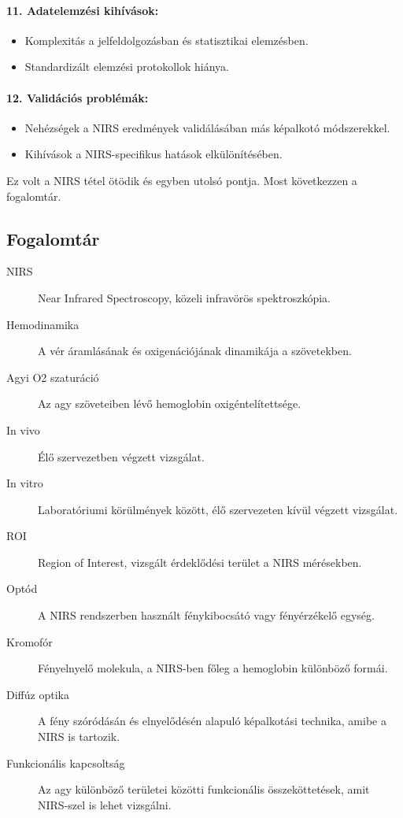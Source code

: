 \documentclass[a4paper,12pt]{article}
\begin{document}
\paragraph{11. Adatelemzési kihívások:} \begin{itemize} \item Komplexitás a jelfeldolgozásban és statisztikai elemzésben. \item Standardizált elemzési protokollok hiánya. \end{itemize}

\paragraph{12. Validációs problémák:} \begin{itemize} \item Nehézségek a NIRS eredmények validálásában más képalkotó módszerekkel. \item Kihívások a NIRS-specifikus hatások elkülönítésében. \end{itemize}

Ez volt a NIRS tétel ötödik és egyben utolsó pontja. Most következzen a fogalomtár.

\subsection{Fogalomtár} 

\begin{description} \item[NIRS] Near Infrared Spectroscopy, közeli infravörös spektroszkópia.

\item[Hemodinamika] A vér áramlásának és oxigenációjának dinamikája a szövetekben. \item[Agyi O2 szaturáció] Az agy szöveteiben lévő hemoglobin oxigéntelítettsége. \item[In vivo] Élő szervezetben végzett vizsgálat. \item[In vitro] Laboratóriumi körülmények között, élő szervezeten kívül végzett vizsgálat. \item[ROI] Region of Interest, vizsgált érdeklődési terület a NIRS mérésekben. \item[Optód] A NIRS rendszerben használt fénykibocsátó vagy fényérzékelő egység. \item[Kromofór] Fényelnyelő molekula, a NIRS-ben főleg a hemoglobin különböző formái. \item[Diffúz optika] A fény szóródásán és elnyelődésén alapuló képalkotási technika, amibe a NIRS is tartozik. \item[Funkcionális kapcsoltság] Az agy különböző területei közötti funkcionális összeköttetések, amit NIRS-szel is lehet vizsgálni.
\end{description}
\end{document}
